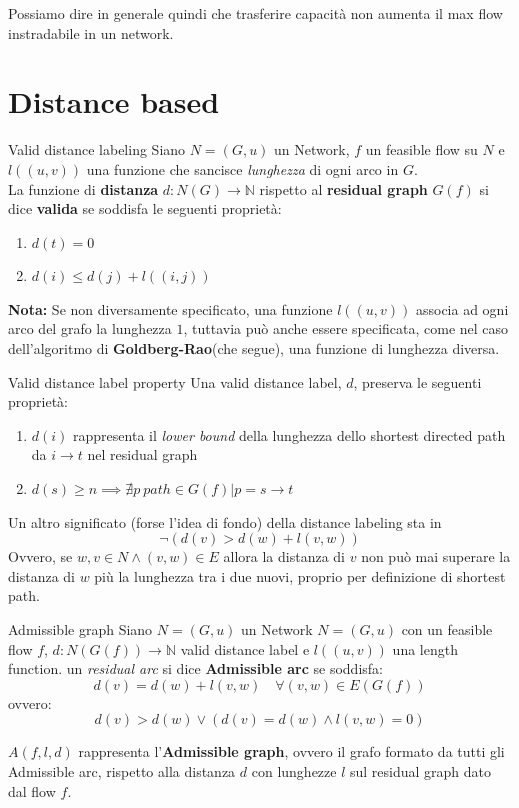 \documentclass[a4paper, 11pt]{report}
\begin{document}
Possiamo dire in generale quindi che trasferire capacità non aumenta il max flow instradabile in un network.

\newpage
\section{Distance based}
\begin{definition}[label = VDL]{Valid distance labeling}{}
    Siano $N = (G,u)$ un Network, $f$ un feasible flow su $N$ e $l((u,v))$ una funzione che sancisce \textit{lunghezza} di ogni arco in $G$.\\
    La funzione di \textbf{distanza} $d: N(G) \rightarrow \mathbb{N}$ rispetto al \textbf{residual graph}
    $G(f)$  si dice \textbf{valida} se soddisfa le seguenti proprietà:
    \begin{enumerate}
        \item $d(t) = 0$
        \item $d(i) \le d(j) + l((i,j))$
    \end{enumerate}
\end{definition}
\textbf{Nota:} Se non diversamente specificato, una funzione $l((u,v))$ associa ad ogni arco del grafo la lunghezza $1$,
 tuttavia può anche essere specificata, come nel caso dell'algoritmo di \textbf{Goldberg-Rao}(che segue),
una funzione di lunghezza diversa. 
\begin{obs}{Valid distance label property}{}
    Una valid distance label, $d$, preserva le seguenti proprietà:
    \begin{enumerate}
        \item $d(i)$ rappresenta il \textit{lower bound} della lunghezza dello shortest directed path da $i \rightarrow t$
        nel residual graph
        \item $d(s) \ge n \implies \nexists p\ path \in G(f) | p = s \rightarrow t $ %
    \end{enumerate}
    
\end{obs}
Un altro significato (forse l'idea di fondo) della distance labeling sta in \[\neg (d(v) > d(w) + l(v,w))\]
Ovvero, se $w,v \in N \land (v,w) \in E$ allora la distanza di $v$ non può mai superare la distanza di $w$ più la lunghezza tra i due nuovi, 
proprio per definizione di shortest path.

\begin{definition}[label = AdmissibleGraph]{Admissible graph}{}
    Siano $N = (G,u)$ un Network $N = (G,u)$ con un feasible flow $f$, $d: N(G(f)) \rightarrow \mathbb{N}$ valid distance label 
    e $l((u,v))$ una length function.
    un \textit{residual arc} si dice \textbf{Admissible arc} se soddisfa:
    \[d(v) = d(w) + l(v,w) \quad \forall (v,w) \in E(G(f))\]
    ovvero:
    \[d(v) > d(w) \lor (d(v) = d(w) \land l(v,w) = 0)\]
    
    $A(f,l,d)$ rappresenta l'\textbf{Admissible graph}, ovvero il grafo formato da tutti gli Admissible arc, rispetto alla distanza $d$ con lunghezze $l$ 
    sul residual graph dato dal flow $f$.
\end{definition}
\end{document}
